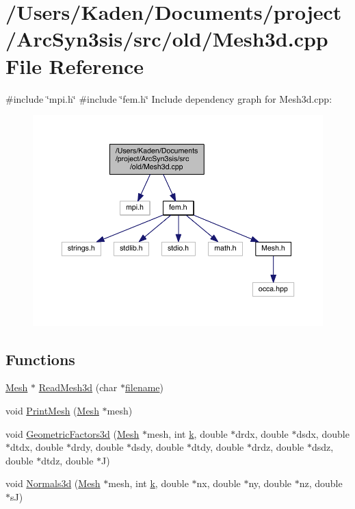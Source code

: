 \hypertarget{a00590}{}\section{/\+Users/\+Kaden/\+Documents/project/\+Arc\+Syn3sis/src/old/\+Mesh3d.cpp File Reference}
\label{a00590}
{\ttfamily \#include \char`\"{}mpi.\+h\char`\"{}}\newline
{\ttfamily \#include \char`\"{}fem.\+h\char`\"{}}\newline
Include dependency graph for Mesh3d.\+cpp\+:\nopagebreak
\begin{figure}[H]
\begin{center}
\leavevmode
\includegraphics[width=350pt]{a00591}
\end{center}
\end{figure}
\subsection*{Functions}
\begin{DoxyCompactItemize}
\item 
\hyperlink{a00557_aeffbe0891ab73a4d8964c9cb7978426e}{Mesh} $\ast$ \hyperlink{a00590_ae31747f9df306a59e6f4df61fddfe15f}{Read\+Mesh3d} (char $\ast$\hyperlink{a00623_a42a21beb8018ac623f4d09db1343b9cf}{filename})
\item 
void \hyperlink{a00590_ad62a25bbacac8912e4932b3163c885f0}{Print\+Mesh} (\hyperlink{a00557_aeffbe0891ab73a4d8964c9cb7978426e}{Mesh} $\ast$mesh)
\item 
void \hyperlink{a00590_a962817a1e01d941ede2d0a7e31f136d7}{Geometric\+Factors3d} (\hyperlink{a00557_aeffbe0891ab73a4d8964c9cb7978426e}{Mesh} $\ast$mesh, int \hyperlink{a00605_a6086917dfee54d84abe1838505c8cf69}{k}, double $\ast$drdx, double $\ast$dsdx, double $\ast$dtdx, double $\ast$drdy, double $\ast$dsdy, double $\ast$dtdy, double $\ast$drdz, double $\ast$dsdz, double $\ast$dtdz, double $\ast$J)
\item 
void \hyperlink{a00590_a7dad59f4c5add70012ffb84d688ce948}{Normals3d} (\hyperlink{a00557_aeffbe0891ab73a4d8964c9cb7978426e}{Mesh} $\ast$mesh, int \hyperlink{a00605_a6086917dfee54d84abe1838505c8cf69}{k}, double $\ast$nx, double $\ast$ny, double $\ast$nz, double $\ast$sJ)
\end{DoxyCompactItemize}


